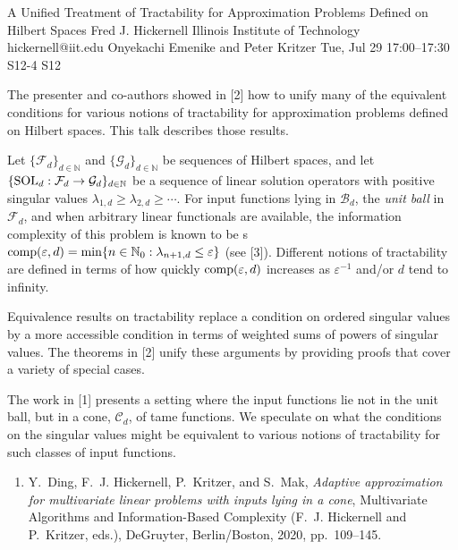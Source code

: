 \begin{talk}
  {A Unified Treatment of Tractability for Approximation Problems Defined on Hilbert Spaces}%
  {Fred J. Hickernell}%
  {Illinois Institute of Technology}%
  {hickernell@iit.edu}%
  {Onyekachi Emenike and Peter Kritzer}%
  {}%
  {Tue, Jul 29 17:00–17:30}%
  {S12-4}%
  {S12}%
  
				
			
The presenter and co-authors showed in [2] how to unify many of the equivalent conditions for various notions of tractability for approximation problems defined on Hilbert spaces.  This talk describes those results.

Let $\{\mathcal{F}_d\}_{d \in \mathbb{N}}$ and $\{\mathcal{G}_d\}_{d \in \mathbb{N}}$ be sequences of Hilbert spaces, and let $\{\textup{SOL}_d : \mathcal{F}_d \to \mathcal{G}_d\}_{d \in \mathbb{N}}$ be a sequence of linear solution operators  with positive singular values $\lambda_{1,d} \ge \lambda_{2,d} \ge \cdots$.  For input functions lying in $\mathcal{B}_d$, the \emph{unit ball} in $\mathcal{F}_d$, and when arbitrary linear functionals are available, the information complexity of this problem is known to be s$\textup{comp}(\varepsilon, d) = \min \{n \in \mathbb{N}_0 : \lambda_{n+1, d} \le \varepsilon\}$ (see [3]).  Different notions of tractability are defined in terms of how quickly $\textup{comp}(\varepsilon, d)$  increases as $\varepsilon^{-1}$ and/or $d$ tend to infinity.

Equivalence results on tractability replace a condition on ordered singular values by a more accessible condition in terms of weighted sums of powers of singular values.  The theorems in [2] unify these arguments by providing proofs that cover a variety of special cases.

The work in [1] presents a setting where the input functions lie not in the unit ball, but in a cone, $\mathcal{C}_d$, of tame functions.  We speculate on what the conditions on the  singular values might be equivalent to various notions of tractability for such classes of input functions.

\begin{enumerate}
\renewcommand{\labelenumi}{[\arabic{enumi}]}
    \item
Y.~Ding, F.~J. Hickernell, P.~Kritzer, and S.~Mak, \emph{Adaptive approximation for multivariate linear problems with inputs lying in a cone}, Multivariate Algorithms and Information-Based Complexity (F.~J. Hickernell and P.~Kritzer, eds.), DeGruyter, Berlin/Boston, 2020, pp.~109--145.


\end{enumerate}
\end{talk}
